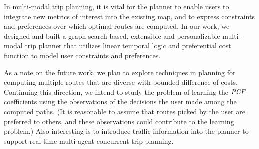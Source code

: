 In multi-modal trip planning, it is vital for the planner to enable
users to integrate new metrics of interest into the existing map,
and to express constraints and preferences over which optimal
routes are computed.
In our work, we designed and built a graph-search based, extensible
and personalizable multi-modal trip planner that utilizes linear
temporal logic and preferential cost
function to model user constraints and preferences.

As a note on the future work, we plan to explore techniques in planning
for computing multiple routes that are diverse with bounded difference of costs.
Continuing this direction, we intend to study the problem of learning the
$\mathit{PCF}$ coefficients using the observations of the decisions the user made among
the computed paths. (It is reasonable to assume that routes picked by the user
are preferred to others, and these observations could contribute to the learning
problem.)
Also interesting is to introduce traffic information into the planner
to support real-time multi-agent concurrent trip planning.
